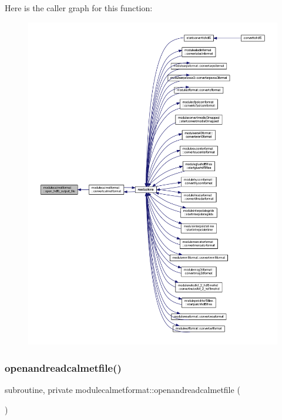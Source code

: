 Here is the caller graph for this function\+:\nopagebreak
\begin{figure}[H]
\begin{center}
\leavevmode
\includegraphics[width=350pt]{namespacemodulecalmetformat_a08504fdf416abe46eab39f11e6104b74_icgraph}
\end{center}
\end{figure}
\mbox{\label{namespacemodulecalmetformat_a5ff4d55d88eac5ea8ceee14dbc6c26af}} 
\subsubsection{\texorpdfstring{openandreadcalmetfile()}{openandreadcalmetfile()}}
{\footnotesize\ttfamily subroutine, private modulecalmetformat\+::openandreadcalmetfile (\begin{DoxyParamCaption}{ }\end{DoxyParamCaption})\hspace{0.3cm}{\ttfamily [private]}}

